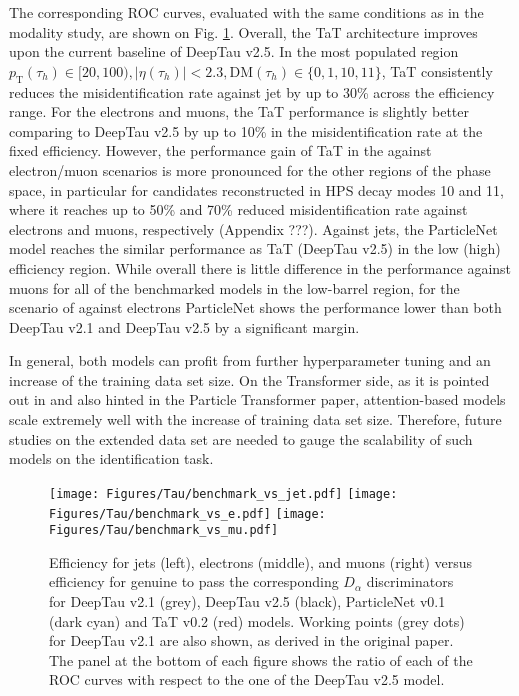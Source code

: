 The corresponding ROC curves, evaluated with the same conditions as in the modality study, are shown on Fig. \ref{fig:benchmark}. Overall, the TaT architecture improves upon the current baseline of DeepTau v2.5. In the most populated region $p_\text{T}(\tau_h) \in [20,100), |\eta(\tau_h)| < 2.3, \text{DM}(\tau_h) \in \{0,1,10,11\}$, TaT consistently reduces the misidentification rate against jet by up to 30\% across the \tauh efficiency range. For the electrons and muons, the TaT performance is slightly better comparing to DeepTau v2.5 by up to 10\% in the misidentification rate at the fixed \tauh efficiency. However, the performance gain of TaT in the against electron/muon scenarios is more pronounced for the other regions of the phase space, in particular for \tauh candidates reconstructed in HPS decay modes 10 and 11, where it reaches up to 50\% and 70\% reduced misidentification rate against electrons and muons, respectively (Appendix ???). Against jets, the ParticleNet model reaches the similar performance as TaT (DeepTau v2.5) in the low (high) \tauh efficiency region. While overall there is little difference in the performance against muons for all of the benchmarked models in the low-\pt barrel region, for the scenario of against electrons ParticleNet shows the performance lower than both DeepTau v2.1 and DeepTau v2.5 by a significant margin.

In general, both models can profit from further hyperparameter tuning and an increase of the training data set size. On the Transformer side, as it is pointed out in \cite{hoffmann2022training} and also hinted in the Particle Transformer paper, attention-based models scale extremely well with the increase of training data set size. Therefore, future studies on the extended data set are needed to gauge the scalability of such models on the \tauh identification task.

\begin{figure}[t!]
    \centering
    \texttt{[image: Figures/Tau/benchmark\_vs\_jet.pdf]}
    \texttt{[image: Figures/Tau/benchmark\_vs\_e.pdf]}
    \texttt{[image: Figures/Tau/benchmark\_vs\_mu.pdf]}
    \caption{Efficiency for jets (left), electrons (middle), and muons (right) versus efficiency for genuine \tauh to pass the corresponding $D_\alpha$ discriminators for DeepTau v2.1 (grey), DeepTau v2.5 (black), ParticleNet v0.1 (dark cyan) and TaT v0.2 (red) models. Working points (grey dots) for DeepTau v2.1 are also shown, as derived in the original paper. The panel at the bottom of each figure shows the ratio of each of the ROC curves with respect to the one of the DeepTau v2.5 model.}
    \label{fig:benchmark}
\end{figure}

